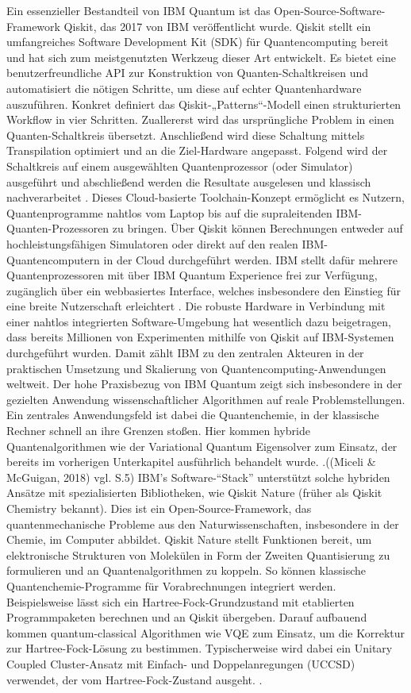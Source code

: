 Ein essenzieller Bestandteil von IBM Quantum ist das Open-Source-Software-Framework Qiskit, das 2017 von IBM veröffentlicht wurde. Qiskit stellt ein umfangreiches Software Development Kit (SDK) für Quantencomputing bereit und hat sich zum meistgenutzten Werkzeug dieser Art entwickelt. Es bietet eine benutzerfreundliche API zur Konstruktion von Quanten-Schaltkreisen und automatisiert die nötigen Schritte, um diese auf echter Quantenhardware auszuführen. Konkret definiert das Qiskit-„Patterns“-Modell einen strukturierten Workflow in vier Schritten. Zuallererst wird das ursprüngliche Problem in einen Quanten-Schaltkreis übersetzt. Anschließend wird diese Schaltung mittels Transpilation optimiert und an die Ziel-Hardware angepasst. Folgend wird der Schaltkreis auf einem ausgewählten Quantenprozessor (oder Simulator) ausgeführt und abschließend werden die Resultate ausgelesen und klassisch nachverarbeitet \citealp[7]{abughanemIBMQuantumComputers2025}. Dieses Cloud-basierte Toolchain-Konzept ermöglicht es Nutzern, Quantenprogramme nahtlos vom Laptop bis auf die supraleitenden IBM-Quanten-Prozessoren zu bringen. Über Qiskit können Berechnungen entweder auf hochleistungsfähigen Simulatoren oder direkt auf den realen IBM-Quantencomputern in der Cloud durchgeführt werden. IBM stellt dafür mehrere Quantenprozessoren mit über IBM Quantum Experience frei zur Verfügung, zugänglich über ein webbasiertes Interface, welches insbesondere den Einstieg für eine breite Nutzerschaft erleichtert \citealp[5]{wangAdvantagesTwoQuantum2025}. Die robuste Hardware in Verbindung mit einer nahtlos integrierten Software-Umgebung hat wesentlich dazu beigetragen, dass bereits Millionen von Experimenten mithilfe von Qiskit auf IBM-Systemen durchgeführt wurden. Damit zählt IBM zu den zentralen Akteuren in der praktischen Umsetzung und Skalierung von Quantencomputing-Anwendungen weltweit.
Der hohe Praxisbezug von IBM Quantum zeigt sich insbesondere in der gezielten Anwendung wissenschaftlicher Algorithmen auf reale Problemstellungen. Ein zentrales Anwendungsfeld ist dabei die Quantenchemie, in der klassische Rechner schnell an ihre Grenzen stoßen. Hier kommen hybride Quantenalgorithmen wie der Variational Quantum Eigensolver zum Einsatz, der bereits im vorherigen Unterkapitel ausführlich behandelt wurde. \citealp[5]{}.((Miceli & McGuigan, 2018) vgl. S.5) IBM’s Software-“Stack” unterstützt solche hybriden Ansätze mit spezialisierten Bibliotheken, wie Qiskit Nature (früher als Qiskit Chemistry bekannt). Dies ist ein Open-Source-Framework, das quantenmechanische Probleme aus den Naturwissenschaften, insbesondere in der Chemie, im Computer abbildet. Qiskit Nature stellt Funktionen bereit, um elektronische Strukturen von Molekülen in Form der Zweiten Quantisierung zu formulieren und an Quantenalgorithmen zu koppeln. So können klassische Quantenchemie-Programme für Vorabrechnungen integriert werden. Beispielsweise lässt sich ein Hartree-Fock-Grundzustand mit etablierten Programmpaketen berechnen und an Qiskit übergeben. Darauf aufbauend kommen quantum-classical Algorithmen wie VQE zum Einsatz, um die Korrektur zur Hartree-Fock-Lösung zu bestimmen. Typischerweise wird dabei ein Unitary Coupled Cluster-Ansatz mit Einfach- und Doppelanregungen (UCCSD) verwendet, der vom Hartree-Fock-Zustand ausgeht. \citealp[2ff.]{avramidisGroundStateProperty2024}.

